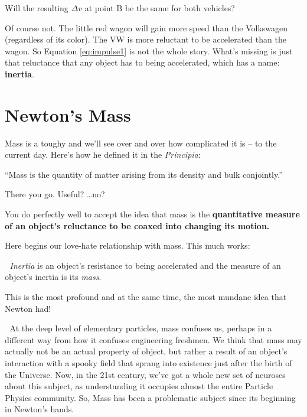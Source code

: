 \documentclass[
  letterpaper,
  DIV=11,
  numbers=noendperiod,
  oneside]{scrreprt}
\begin{document}
Will the resulting \(\Delta v\) at point B be the same for both
vehicles?

Of course not. The little red wagon will gain more speed than the
Volkswagen (regardless of its color). The VW is more reluctant to be
accelerated than the wagon. So Equation \eqref{eq:impulse1} is not the
whole story. What's missing is just that reluctance that any object has
to being accelerated, which has a name: \textbf{inertia}.

\section{Newton's Mass}\label{sec-mechmass}

Mass is a toughy and we'll see over and over how complicated it is -- to
the current day. Here's how he defined it in the \emph{Principia}:

``Mass is the quantity of matter arising from its density and bulk
conjointly.''

There you go. Useful? \ldots no?

You do perfectly well to accept the idea that mass is the
\textbf{quantitative measure of an object's reluctance to be coaxed into
changing its motion.}

Here begins our love-hate relationship with mass. This much works:

\begin{tcolorbox}[enhanced jigsaw, toprule=.15mm, opacityback=0, colframe=quarto-callout-important-color-frame, rightrule=.15mm, coltitle=black, bottomtitle=1mm, colbacktitle=quarto-callout-important-color!10!white, bottomrule=.15mm, toptitle=1mm, titlerule=0mm, title={Important}, arc=.35mm, leftrule=.75mm, left=2mm, colback=white, breakable, opacitybacktitle=0.6]

🫵 \emph{Inertia} is an object's resistance to being accelerated and the
measure of an object's inertia is its \emph{mass}.

\end{tcolorbox}

This is the most profound and at the same time, the most mundane idea
that Newton had!

\begin{tcolorbox}[enhanced jigsaw, toprule=.15mm, opacityback=0, colframe=quarto-callout-tip-color-frame, rightrule=.15mm, coltitle=black, bottomtitle=1mm, colbacktitle=quarto-callout-tip-color!10!white, bottomrule=.15mm, toptitle=1mm, titlerule=0mm, title={Tip}, arc=.35mm, leftrule=.75mm, left=2mm, colback=white, breakable, opacitybacktitle=0.6]

🔐 At the deep level of elementary particles, mass confuses us, perhaps
in a different way from how it confuses engineering freshmen. We think
that mass may actually not be an actual property of object, but rather a
result of an object's interaction with a spooky field that sprang into
existence just after the birth of the Universe. Now, in the 21st
century, we've got a whole new set of neuroses about this subject, as
understanding it occupies almost the entire Particle Physics community.
So, Mass has been a problematic subject since its beginning in Newton's
hands.

\end{tcolorbox}
\end{document}
